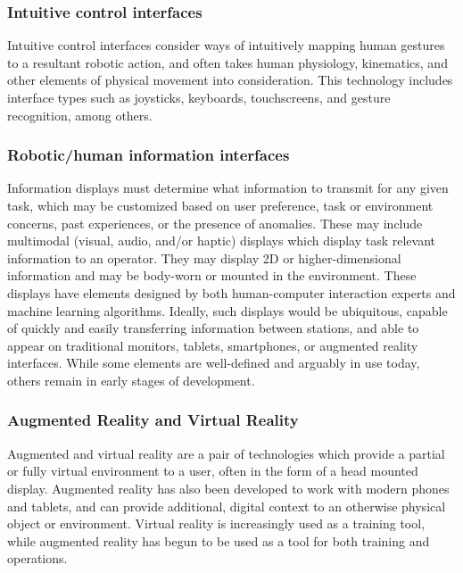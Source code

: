 \subsubsection{Intuitive control interfaces}
Intuitive control interfaces consider ways of intuitively mapping human gestures to a resultant robotic action, and often takes human physiology, kinematics, and other elements of physical movement into consideration.
This technology includes interface types such as joysticks, keyboards, touchscreens, and gesture recognition, among others.

\subsubsection{Robotic/human information interfaces}
Information displays must determine what information to transmit for any given task, which may be customized based on user preference, task or environment concerns, past experiences, or the presence of anomalies.
These may include multimodal (visual, audio, and/or haptic) displays which display task relevant information to an operator.
They may display 2D or higher-dimensional information and may be body-worn or mounted in the environment.
These displays have elements designed by both human-computer interaction experts and machine learning algorithms.
Ideally, such displays would be ubiquitous, capable of quickly and easily transferring information between stations, and able to appear on traditional monitors, tablets, smartphones, or augmented reality interfaces.
While some elements are well-defined and arguably in use today, others remain in early stages of development.

\subsubsection{Augmented Reality and Virtual Reality}
Augmented and virtual reality are a pair of technologies which provide a partial or fully virtual environment to a user, often in the form of a head mounted display.
Augmented reality has also been developed to work with modern phones and tablets, and can provide additional, digital context to an otherwise physical object or environment.
Virtual reality is increasingly used as a training tool, while augmented reality has begun to be used as a tool for both training and operations.

